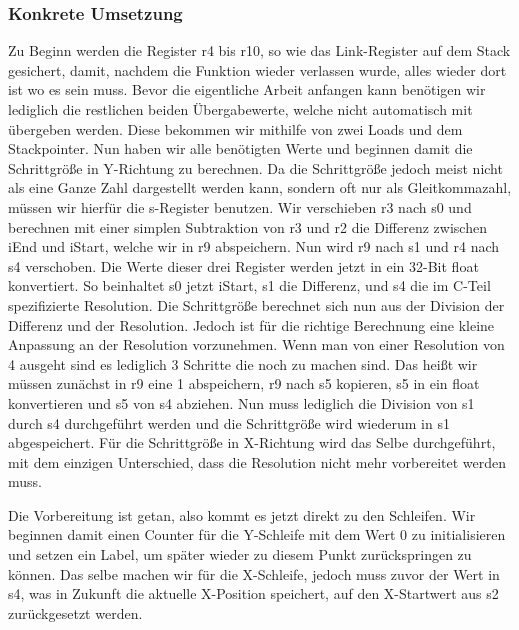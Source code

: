 \documentclass[11pt]{scrartcl}
\begin{document}
\subsubsection{Konkrete Umsetzung}
Zu Beginn werden die Register r4 bis r10, so wie das Link-Register auf dem Stack gesichert, damit, nachdem die Funktion wieder verlassen wurde, alles wieder dort ist wo es sein muss.
Bevor die eigentliche Arbeit anfangen kann benötigen wir lediglich die restlichen beiden Übergabewerte, welche nicht automatisch mit übergeben werden.
Diese bekommen wir mithilfe von zwei Loads und dem Stackpointer.
Nun haben wir alle benötigten Werte und beginnen damit die Schrittgröße in Y-Richtung zu berechnen.
Da die Schrittgröße jedoch meist nicht als eine Ganze Zahl dargestellt werden kann, sondern oft nur als Gleitkommazahl, müssen wir hierfür die s-Register benutzen.
Wir verschieben r3 nach s0 und berechnen mit einer simplen Subtraktion von r3 und r2 die Differenz zwischen iEnd und iStart, welche wir in r9 abspeichern.
Nun wird r9 nach s1 und r4 nach s4 verschoben. Die Werte dieser drei Register werden jetzt in ein 32-Bit float konvertiert.
So beinhaltet s0 jetzt iStart, s1 die Differenz, und s4 die im C-Teil spezifizierte Resolution.
Die Schrittgröße berechnet sich nun aus der Division der Differenz und der Resolution.
Jedoch ist für die richtige Berechnung eine kleine Anpassung an der Resolution vorzunehmen.
Wenn man von einer Resolution von 4 ausgeht sind es lediglich 3 Schritte die noch zu machen sind.
Das heißt wir müssen zunächst in r9 eine 1 abspeichern, r9 nach s5 kopieren, s5 in ein float konvertieren und s5 von s4 abziehen.
Nun muss lediglich die Division von s1 durch s4 durchgeführt werden und die Schrittgröße wird wiederum in s1 abgespeichert.
Für die Schrittgröße in X-Richtung wird das Selbe durchgeführt, mit dem einzigen Unterschied, dass die Resolution nicht mehr vorbereitet werden muss.

Die Vorbereitung ist getan, also kommt es jetzt direkt zu den Schleifen.
Wir beginnen damit einen Counter für die Y-Schleife mit dem Wert 0 zu initialisieren und setzen ein Label, um später wieder zu diesem Punkt zurückspringen zu können.
Das selbe machen wir für die X-Schleife, jedoch muss zuvor der Wert in s4, was in Zukunft die aktuelle X-Position speichert, auf den X-Startwert aus s2 zurückgesetzt werden.
\end{document}

